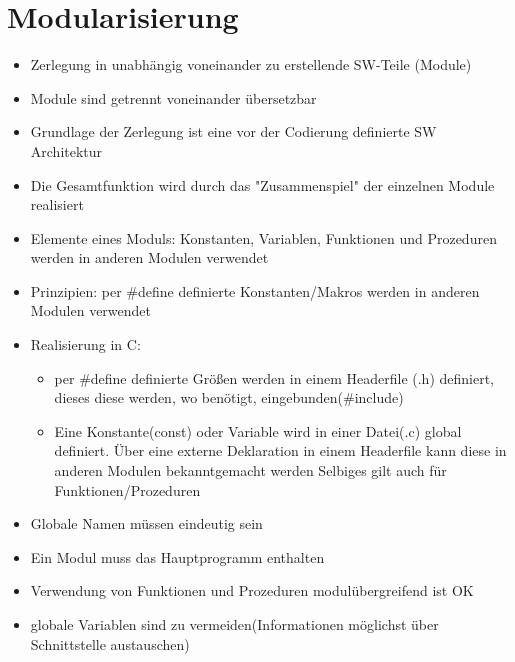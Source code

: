 \documentclass[10pt,a5paper]{article}
\begin{document}
\section{Modularisierung}
\begin{itemize}
\item Zerlegung in unabhängig voneinander zu erstellende SW-Teile (Module)
\item Module sind getrennt voneinander übersetzbar
\item Grundlage der Zerlegung ist eine vor der Codierung definierte SW Architektur
\item Die Gesamtfunktion wird durch das "Zusammenspiel" der einzelnen Module realisiert
\item Elemente eines Moduls:
\subitem Konstanten, Variablen, Funktionen und Prozeduren werden in anderen Modulen verwendet
\item Prinzipien:
\subitem per \#define definierte Konstanten/Makros werden in anderen Modulen verwendet
\item Realisierung in C:\begin{itemize}
\item per \#define definierte Größen werden in einem Headerfile (.h) definiert, dieses diese werden, wo benötigt, eingebunden(\#include)
\item Eine Konstante(const) oder Variable wird in einer Datei(.c) global definiert. Über eine externe Deklaration in einem Headerfile kann diese in anderen Modulen bekanntgemacht werden
\subitem Selbiges gilt auch für Funktionen/Prozeduren
\end{itemize}
\item Globale Namen müssen eindeutig sein
\item Ein Modul muss das Hauptprogramm enthalten
\item Verwendung von Funktionen und Prozeduren modulübergreifend ist OK
\item globale Variablen sind zu vermeiden(Informationen möglichst über Schnittstelle austauschen)
\end{itemize}
\newpage
\end{document}

